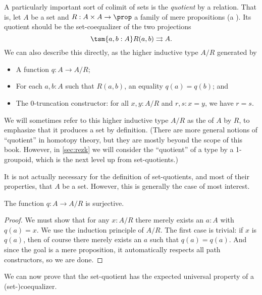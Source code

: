 A particularly important sort of colimit of sets is the \emph{quotient} by a relation.
That is, let $A$ be a set and $R:A\times A \to \prop$ a family of mere propositions (a ).
%
%
Its quotient should be the set-coequalizer of the two projections
\[ \tsm{a,b:A} R(a,b) \rightrightarrows A. \]
We can also describe this directly, as the higher inductive type $A/R$ generated by
%
%
%
\begin{itemize}
\item A function $q:A\to A/R$;
\item For each $a,b:A$ such that $R(a,b)$, an equality $q(a)=q(b)$; and
\item The $0$-truncation constructor: for all $x,y:A/R$ and $r,s:x=y$, we have $r=s$.
\end{itemize}
We will sometimes refer to this higher inductive type $A/R$ as the  of $A$ by $R$, to emphasize that it produces a set by definition.
(There are more general notions of ``quotient'' in homotopy theory, but they are mostly beyond the scope of this book.
However, in \cref{sec:rezk} we will consider the ``quotient'' of a type by a 1-groupoid, which is the next level up from set-quotients.)

\begin{rmk}\label{rmk:quotient-of-non-set}
  It is not actually necessary for the definition of set-quotients, and most of their properties, that $A$ be a set.
  However, this is generally the case of most interest.
\end{rmk}

\begin{lem}\label{thm:quotient-surjective}
  The function $q:A\to A/R$ is surjective.
\end{lem}
\begin{proof}
  We must show that for any $x:A/R$ there merely exists an $a:A$ with $q(a)=x$.
  We use the induction principle of $A/R$.
  The first case is trivial: if $x$ is $q(a)$, then of course there merely exists an $a$ such that $q(a)=q(a)$.
  And since the goal is a mere proposition, it automatically respects all path constructors, so we are done.
\end{proof}

We can now prove that the set-quotient has the expected universal property of a (set-)coequalizer.

